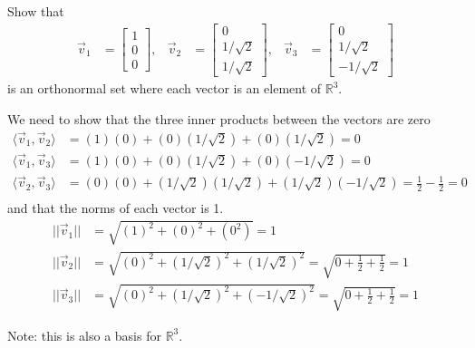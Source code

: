 \begin{example}
 Show that 
\begin{align*}
 \vec{v}_1 &= 
\begin{bmatrix}
 1 \\ 0 \\ 0 
\end{bmatrix}, & 
\vec{v}_2 & = 
\begin{bmatrix}
 0 \\ 1/\sqrt{2} \\ 1/\sqrt{2}
\end{bmatrix}, & 
\vec{v}_3 & = 
\begin{bmatrix}
 0 \\ 1/\sqrt{2} \\ -1/\sqrt{2} 
\end{bmatrix}
\end{align*}
is an orthonormal set where each vector is an element of $\mathbb{R}^3$.  

\solution

We need to show that the three inner products between the vectors are zero 
%
\begin{align*}
\langle \vec{v}_1, \vec{v}_2 \rangle & = (1)(0) + (0)(1/\sqrt{2}) + (0)(1/\sqrt{2}) = 0 \\
\langle \vec{v}_1, \vec{v}_3 \rangle & = (1)(0) + (0)(1/\sqrt{2}) + (0)(-1/\sqrt{2}) = 0 \\
\langle \vec{v}_2, \vec{v}_3 \rangle & = (0)(0) + (1/\sqrt{2})(1/\sqrt{2}) + (1/\sqrt{2})(-1/\sqrt{2}) = \frac{1}{2} - \frac{1}{2} = 0  \\
\end{align*}
%
and that the norms of each vector is 1.  
%
\begin{align*}
||\vec{v}_1|| & = \sqrt{(1)^2 + (0)^2 + (0^2)} = 1 \\
||\vec{v}_2|| & = \sqrt{(0)^2 + (1/\sqrt{2})^2 + (1/\sqrt{2})^2} = \sqrt{0 + \frac{1}{2} + \frac{1}{2}} = 1 \\
||\vec{v}_3|| & = \sqrt{(0)^2 + (1/\sqrt{2})^2 + (-1/\sqrt{2})^2} = \sqrt{0 + \frac{1}{2} + \frac{1}{2}} = 1 
\end{align*}

Note: this is also a basis for $\mathbb{R}^3$.  
\end{example}


